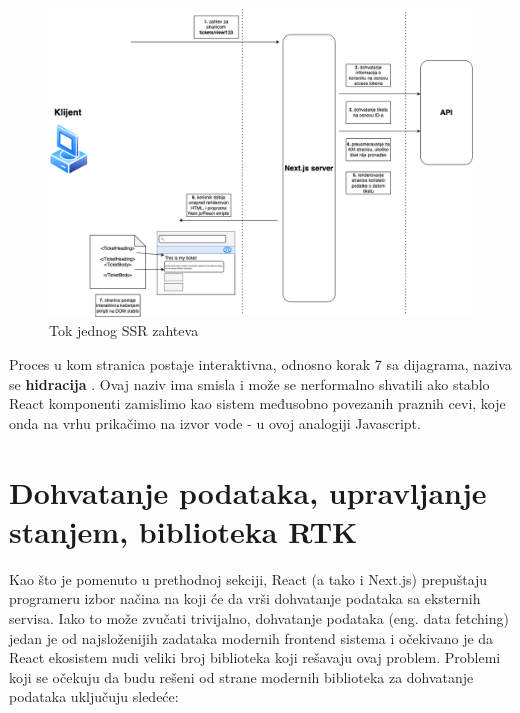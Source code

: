 \documentclass[12pt,oneside]{memoir}
\begin{document}
\begin{figure}[h]
  \centering
  \includegraphics[width=1\textwidth]{docs/images/ch_4/nextjs_flow.png} 
  \caption{Tok jednog SSR zahteva}
  \label{fig:ssrdiagram}
\end{figure}

Proces u kom stranica postaje interaktivna, odnosno korak 7 sa dijagrama, naziva se \textbf{hidracija} \cite{reactdocscomponents}. Ovaj naziv ima smisla i može se nerformalno shvatili ako stablo React komponenti zamislimo kao sistem međusobno povezanih praznih cevi, koje onda na vrhu prikačimo na izvor vode - u ovoj analogiji Javascript.

\newpage
\label{sec:datafetchingandconfiguration}
\section{Dohvatanje podataka, upravljanje stanjem, biblioteka RTK}

Kao što je pomenuto u prethodnoj sekciji, React (a tako i Next.js) prepuštaju programeru izbor načina na koji će da vrši dohvatanje podataka sa eksternih servisa. Iako to može zvučati trivijalno, dohvatanje podataka (eng. data fetching) jedan je od najsloženijih zadataka modernih frontend sistema i očekivano je da React ekosistem nudi veliki broj biblioteka koji rešavaju ovaj problem. Problemi koji se očekuju da budu rešeni od strane modernih biblioteka za dohvatanje podataka uključuju sledeće:
\end{document}
